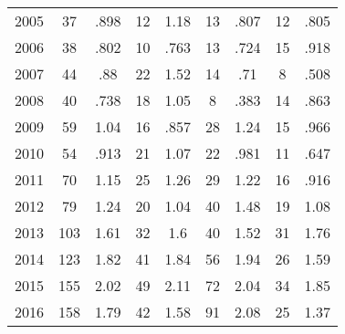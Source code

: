 \begin{table}[htbp]
\begin{tabular}{l*{8}{c}}
2005      &       37&     .898&       12&     1.18&       13&     .807&       12&     .805\\
2006      &       38&     .802&       10&     .763&       13&     .724&       15&     .918\\
2007      &       44&      .88&       22&     1.52&       14&      .71&        8&     .508\\
2008      &       40&     .738&       18&     1.05&        8&     .383&       14&     .863\\
2009      &       59&     1.04&       16&     .857&       28&     1.24&       15&     .966\\
2010      &       54&     .913&       21&     1.07&       22&     .981&       11&     .647\\
2011      &       70&     1.15&       25&     1.26&       29&     1.22&       16&     .916\\
2012      &       79&     1.24&       20&     1.04&       40&     1.48&       19&     1.08\\
2013      &      103&     1.61&       32&      1.6&       40&     1.52&       31&     1.76\\
2014      &      123&     1.82&       41&     1.84&       56&     1.94&       26&     1.59\\
2015      &      155&     2.02&       49&     2.11&       72&     2.04&       34&     1.85\\
2016      &      158&     1.79&       42&     1.58&       91&     2.08&       25&     1.37\\
\hline\hline
\end{tabular}
\end{table}
